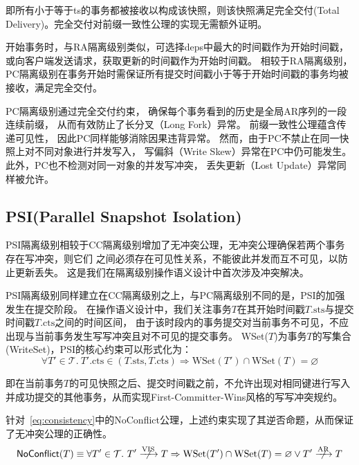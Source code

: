 即所有小于等于ts的事务都被接收以构成该快照，则该快照满足完全交付(Total Delivery)。完全交付对前缀一致性公理的实现无需额外证明。

开始事务时，与RA隔离级别类似，可选择deps中最大的时间戳作为开始时间戳，或向客户端发送\tick 请求，获取更新的时间戳作为开始时间戳。
相较于RA隔离级别，PC隔离级别在事务开始时需保证所有提交时间戳小于等于开始时间戳的事务均被接收，满足完全交付。

PC隔离级别通过完全交付约束，
确保每个事务看到的历史是全局AR序列的一段连续前缀，
从而有效防止了长分叉（Long Fork）异常。
前缀一致性公理蕴含传递可见性，
因此PC同样能够消除因果违背异常。
然而，由于PC不禁止在同一快照上对不同对象进行并发写入，
写偏斜（Write Skew）异常在PC中仍可能发生。
此外，PC也不检测对同一对象的并发写冲突，
丢失更新（Lost Update）异常同样被允许。

\subsection{PSI(Parallel Snapshot Isolation)}

PSI隔离级别相较于CC隔离级别增加了无冲突公理，无冲突公理确保若两个事务存在写冲突，则它们
之间必须存在可见性关系，不能彼此并发而互不可见，以防止更新丢失。
这是我们在隔离级别操作语义设计中首次涉及冲突解决。

PSI隔离级别同样建立在CC隔离级别之上，与PC隔离级别不同的是，PSI的加强发生在提交阶段。
在操作语义设计中，我们关注事务$T$在其开始时间戳$T.\text{sts}$与提交时间戳$T.\text{cts}$之间的时间区间，
由于该时段内的事务提交对当前事务不可见，不应出现与当前事务\Txc 发生写写冲突且对\Txc 不可见的提交事务。
WSet($T$)为事务$T$的写集合(WriteSet)，PSI的核心约束可以形式化为：
\begin{equation}
    \forall T' \in \mathcal{T}.\ T'.\text{cts} \in (T.\text{sts}, T.\text{cts}) \Rightarrow \text{WSet}(T') \cap \text{WSet}(T) = \varnothing
\end{equation}

即在当前事务$T$的可见快照之后、提交时间戳之前，不允许出现对相同键进行写入并成功提交的其他事务，从而实现First-Committer-Wins风格的写写冲突规约。

针对~\ref{eq:consistency}中的NoConflict公理，上述约束实现了其逆否命题，从而保证了无冲突公理的正确性。
\begin{equation}
\mathsf{NoConflict}(T) \equiv \forall T' \in \mathcal{T}.
\ T' \centernot{\xrightarrow{\text{VIS}}} T \Rightarrow \text{WSet}(T') \cap \text{WSet}(T) = \varnothing \lor T' \centernot{\xrightarrow{\text{AR}}} T
\end{equation}

